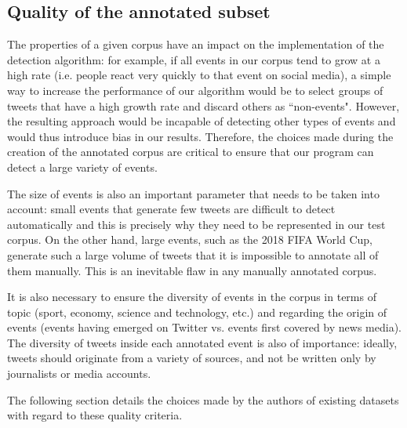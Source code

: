 \subsection{Quality of the annotated subset}

The properties of a given corpus have an impact on the implementation of the detection algorithm: for example, if all events in our corpus tend to grow at a high rate (i.e. people react very quickly to that event on social media), a simple way to increase the performance of our algorithm would be to select groups of tweets that have a high growth rate and discard others as ``non-events". However, the resulting approach would be incapable of detecting other types of events and would thus introduce bias in our results. Therefore, the choices made during the creation of the annotated corpus are critical to ensure that our program can detect a large variety of events.

The size of events is also an important parameter that needs to be taken into account: small events that generate few tweets are difficult to detect automatically and this is precisely why they need to be represented in our test corpus. On the other hand, large events, such as the 2018 FIFA World Cup, generate such a large volume of tweets that it is impossible to annotate all of them manually. This is an inevitable flaw in any manually annotated corpus.

It is also necessary to ensure the diversity of events in the corpus in terms of topic (sport, economy, science and technology, etc.) and regarding the origin of events (events having emerged on Twitter vs. events first covered by news media). The diversity of tweets inside each annotated event is also of importance: ideally, tweets should originate from a variety of sources, and not be written only by journalists or media accounts.

The following section details the choices made by the authors of existing datasets with regard to these quality criteria.
        
		


